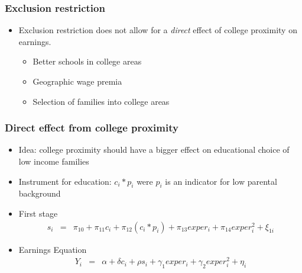 \documentclass[pdftex]{beamer}
\begin{document}
\begin{frame}
\frametitle{Exclusion restriction}
\begin{itemize}
\item Exclusion restriction does not allow for a \emph{direct} effect of college proximity on earnings.
\begin{itemize}
  \item Better schools in college areas
  \item Geographic wage premia
  \item Selection of families into college areas
\end{itemize}
\end{itemize}

\end{frame}


\begin{frame}
\frametitle{Direct effect from college proximity}

\begin{itemize}

\item Idea: college proximity should have a bigger effect on educational choice of low income families 
\item Instrument for education: $c_i * p_i$ were $p_i$ is an indicator for low parental background
\item First stage
\begin{eqnarray*}
  s_i &=& \pi_{10} + \pi_{11} c_i + \pi_{12} (c_i* p_i) + \pi_{13} exper_i + \pi_{14} exper_i^2 + \xi_{1i}
\end{eqnarray*}
\item Earnings Equation
\begin{eqnarray*}
  Y_i &=& \alpha + \delta c_i + \rho s_i + \gamma_1 exper_i + \gamma_2 exper_i^2 + \eta_i
\end{eqnarray*}

\end{itemize}

\end{frame}
\end{document}
